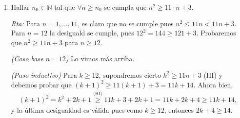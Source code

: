 \documentclass[a4paper,12pt,twoside,spanish,reqno]{amsbook}
\numberwithin{equation}{section}
\newcommand{\rta}{\noindent\textit{Rta: }}
\begin{document}
\begin{enumerate}
\begin{enumerate}
            \rta Lo que debemos probar es equivalente a $\prod_{i=1}^{n} (1-a_i) \ge 1 - \sum_{i=1}^{n} a_i$ y la demostraremos haciendo inducción en $n$.  
            
            \textit{(Caso base $n=1$) } $\prod_{i=1}^{1} (1-a_i) = 1-a_1 = 1 - \sum_{i=1}^{1} a_i$.
            
            \textit{(Paso inductivo) }  Para  $k \ge 1$,  supondremos cierto  $\prod_{i=1}^{k} (1-a_i) \ge 1 - \sum_{i=1}^{k} a_i$ (HI) y probaremos  $\prod_{i=1}^{k+1} (1-a_i) \ge 1 - \sum_{i=1}^{k+1} a_i$. Ahora bien, 
            \begin{align*}
            \prod_{i=1}^{k+1} (1-a_i) &\overset{(\text{def } \Pi)}{=\quad} \prod_{i=1}^{k} (1-a_i)\cdot (1-a_{k+1})\\
            &\overset{\text{(HI)}}{\ge}  (1 - \sum_{i=1}^{k} a_i)\cdot (1-a_{k+1}) =(*)
            \end{align*}
            La última desigualdad es verdadera, puesto  que como $0<a_{k+1}<1$, entonces $0<1-a_{k+1}<1$. 
            Luego
            \begin{align*}
                (*)&= 1 - \sum_{i=1}^{k} a_i -a_{k+1} +  (\sum_{i=1}^{k} a_i)a_{k+1} \overset{(\text{def } \Sigma)}{=} 1 - \sum_{i=1}^{k+1} a_i +  (\sum_{i=1}^{k} a_i)a_{k+1} \\
                &\ge  1 - \sum_{i=1}^{k+1} a_i,
            \end{align*}
            y  esta última desigualdad se debe a que $(\sum_{i=1}^{k} a_i)a_{k+1} \ge 0$.
        \end{enumerate}
        
        \medskip
        
        
        
        
        \item Hallar $n_0 \in {\mathbb N}$ tal que $\forall n \ge n_0$ se cumpla que $n^2 \ge 11 \cdot n + 3$.
        
        \rta Para $n=1,\ldots,11$,  es claro que no se cumple pues $n^2 \le 11n < 11n +3$. Para $n =12$ la desiguald se cumple, pues $12^2 = 144 \ge 121+3$.   Probaremos  que $n^2 \ge 11  n + 3$ para $n\ge 12$. 
        
            \textit{(Caso base $n=12$) } Lo vimos más arriba.
            
            \textit{(Paso inductivo) }  Para  $k \ge 12$,  supondremos cierto $k^2 \ge 11  n + 3$ (HI) y debemos probar que $(k+1)^2 \ge 11  (k+1) + 3 =11k +14$. Ahora bien, 
            \begin{align*}
                (k+1)^2 = k^2+2k+1 \overset{\text{(HI)}}{\ge} 11k+3 +2k+1 = 11k + 2k+ 4 \ge 11k +14, 
            \end{align*}
            y la última desigualdad es válida pues como  $k\ge 12$,  entonces $2k+ 4 \ge 14$.
        

\end{enumerate}
\end{document}
